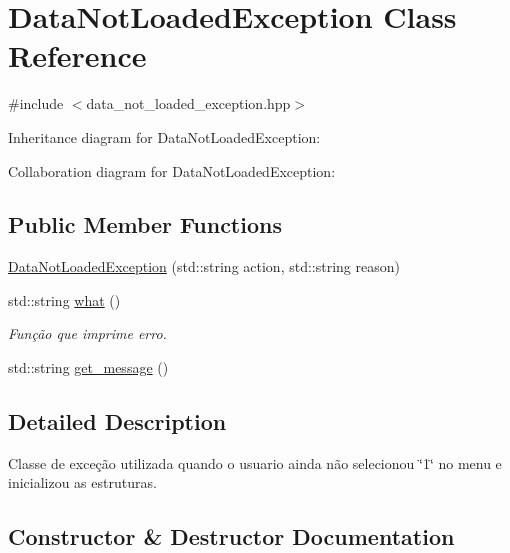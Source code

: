 \hypertarget{class_data_not_loaded_exception}{}\section{Data\+Not\+Loaded\+Exception Class Reference}
\label{class_data_not_loaded_exception}


{\ttfamily \#include $<$data\+\_\+not\+\_\+loaded\+\_\+exception.\+hpp$>$}



Inheritance diagram for Data\+Not\+Loaded\+Exception\+:


Collaboration diagram for Data\+Not\+Loaded\+Exception\+:
\subsection*{Public Member Functions}
\begin{DoxyCompactItemize}
\item 
\hyperlink{class_data_not_loaded_exception_a54485da631c36bd0ea52ba857b54a9fe}{Data\+Not\+Loaded\+Exception} (std\+::string action, std\+::string reason)
\item 
std\+::string \hyperlink{class_data_not_loaded_exception_aff68ebafb677711bd4be70865681fc50}{what} ()
\begin{DoxyCompactList}\small\item\em Função que imprime erro. \end{DoxyCompactList}\item 
std\+::string \hyperlink{class_data_not_loaded_exception_a0582e704a9d3718bbcd7bce99c1756b6}{get\+\_\+message} ()
\end{DoxyCompactItemize}


\subsection{Detailed Description}
Classe de exceção utilizada quando o usuario ainda não selecionou \char`\"{}1\char`\"{} no menu e inicializou as estruturas. 

\subsection{Constructor \& Destructor Documentation}
\mbox{\label{class_data_not_loaded_exception_a54485da631c36bd0ea52ba857b54a9fe}} 
